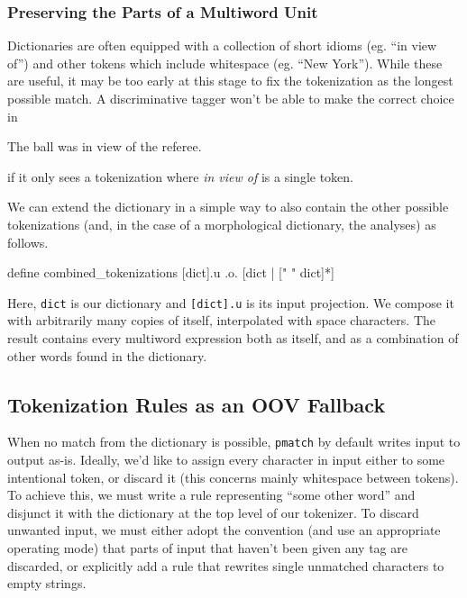 \documentclass{llncs}
\begin{document}
\subsubsection{Preserving the Parts of a Multiword Unit}

Dictionaries are often equipped with a collection of short idioms (eg.\@
``in view of'') and other tokens which include whitespace (eg.\@
``New York''). While these are useful, it may be too early at this stage
to fix the tokenization as the longest possible match. A discriminative
tagger won't be able to make the correct choice in

\begin{exe}
  \item The ball was in view of the referee.
\end{exe}

if it only sees a tokenization where \emph{in view of} is a single token.

We can extend the dictionary in a simple way to also contain the other
possible tokenizations (and, in the case of a morphological dictionary,
the analyses) as follows.

\begin{verb}
define combined_tokenizations [dict].u .o. [dict | [" " dict]*]  
\end{verb}

Here, \verb+dict+ is our dictionary and \verb+[dict].u+ is its input
projection. We compose it with arbitrarily many copies of itself,
interpolated with space characters. The result contains every multiword
expression both as itself, and as a combination of other words found
in the dictionary.

\subsection{Tokenization Rules as an OOV Fallback}

When no match from the dictionary is possible, \verb+pmatch+ by default
writes input to output as-is. Ideally, we'd like to assign every character
in input either to some intentional token, or discard it (this concerns mainly
whitespace between tokens). To achieve this, we must write a rule representing
``some other word'' and disjunct it with the dictionary at the top level of
our tokenizer. To discard unwanted input, we must either adopt the convention
(and use an appropriate operating mode) that parts of input that haven't been
given any tag are discarded, or explicitly add a rule that rewrites single
unmatched characters to empty strings.
\end{document}
